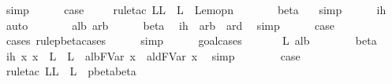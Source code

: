 \begin{isabellebody}
\ simp{\isacharplus}\isanewline
\ \ \ \ \isamarkupfalse%
\ {\isacharquery}case\ \isamarkupfalse%
\ {}\ \isamarkupfalse%
\ {\isacharparenleft}rule{\isacharunderscore}tac\ L{\isacharequal}{\isachardoublequoteopen}L\ {\isasymunion}\ L{\isacharprime}{\isachardoublequoteclose}\ \ Lem{}{\isacharunderscore}{}{\isacharunderscore}{}opn{\isacharparenright}\isanewline
\ \ \ \ \isamarkupfalse%
\ \isamarkupfalse%
\ beta{\isacharparenleft}{}{\isacharparenright}\ {}{\isacharparenleft}{}{\isacharparenright}\ \isamarkupfalse%
\ simp\isanewline
\ \ \ \ \isamarkupfalse%
\ ih\ \isamarkupfalse%
\ auto\isanewline
\ \ \isamarkupfalse%
\isanewline
\ \ \isamarkupfalse%
\ {\isacharparenleft}{}\ alb\ arb{\isacharparenright}\isanewline
\ \ \ \ \isamarkupfalse%
\ beta\ \isamarkupfalse%
\ ih{\isacharcolon}\ \ {\isachardoublequoteopen}arb\ {\isasymggreater}\ ard{\isachardoublequoteclose}\ \isamarkupfalse%
\ simp\isanewline
\ \ \ \ \isamarkupfalse%
\ {\isacharquery}case\ \isamarkupfalse%
\ {}\ \isanewline
\ \ \ \ \isamarkupfalse%
\ {}{\isacharparenleft}{}{\isacharparenright}\ \isamarkupfalse%
\ {\isacharparenleft}cases\ rule{\isacharcolon}pbeta{\isachardot}cases{\isacharparenright}\isanewline
\ \ \ \ \isamarkupfalse%
\ simp\isanewline
\ \ \ \ \isamarkupfalse%
\ goal{\isacharunderscore}cases\isanewline
\ \ \ \ \isamarkupfalse%
\ {\isacharparenleft}{}\ L{\isacharprime}\ alb{\isacharprime}{\isacharparenright}\isanewline
\ \ \ \ \ \ \isamarkupfalse%
\ beta\ \isamarkupfalse%
\ ih{}{\isacharcolon}\ {\isachardoublequoteopen}{\isasymAnd}x{\isachardot}\ x\ {\isasymnotin}\ L\ {\isasymunion}\ L{\isacharprime}\ {\isasymLongrightarrow}\ alb{\isacharprime}{\isacharcircum}FVar\ x\ {\isasymggreater}\ ald{\isacharcircum}FVar\ x{\isachardoublequoteclose}\ \isamarkupfalse%
\ simp\isanewline
\ \ \ \ \ \ \isamarkupfalse%
\ {\isacharquery}case\isanewline
\ \ \ \ \ \ \isamarkupfalse%
\ {\isacharparenleft}rule{\isacharunderscore}tac\ L{\isacharequal}{\isachardoublequoteopen}L\ {\isasymunion}\ L{\isacharprime}{\isachardoublequoteclose}\ \ pbeta{\isachardot}beta{\isacharparenright}\isanewline

\end{isabellebody}
